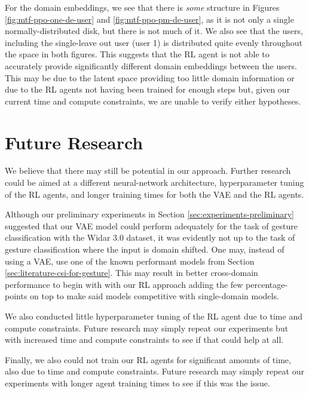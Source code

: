 For the domain embeddings, we see that there is \textit{some} structure in Figures \ref{fig:mtf-ppo-one-de-user} and \ref{fig:mtf-ppo-pm-de-user}, as it is not only a single normally-distributed disk, but there is not much of it.
We also see that the users, including the single-leave out user (user 1) is distributed quite evenly throughout the space in both figures.
This suggests that the RL agent is not able to accurately provide significantly different domain embeddings between the users.
This may be due to the latent space providing too little domain information or due to the RL agents not having been trained for enough steps but, given our current time and compute constraints, we are unable to verify either hypotheses.

\section{Future Research}

We believe that there may still be potential in our approach.
Further research could be aimed at a different neural-network architecture, hyperparameter tuning of the RL agents, and longer training times for both the VAE and the RL agents.

Although our preliminary experiments in Section \ref{sec:experiments-preliminary} suggested that our VAE model could perform adequately for the task of gesture classification with the Widar 3.0 dataset, it was evidently not up to the task of gesture classification where the input is domain shifted.
One may, instead of using a VAE, use one of the known performant models from Section \ref{sec:literature-csi-for-gesture}.
This may result in better cross-domain performance to begin with with our RL approach adding the few percentage-points on top to make said models competitive with single-domain models.

We also conducted little hyperparameter tuning of the RL agent due to time and compute constraints. 
Future research may simply repeat our experiments but with increased time and compute constraints to see if that could help at all.

Finally, we also could not train our RL agents for significant amounts of time, also due to time and compute constraints.
Future research may simply repeat our experiments with longer agent training times to see if this was the issue.
